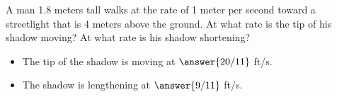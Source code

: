 \documentclass{ximera}
\author{Bart Snapp}
\begin{document}
\begin{exercise}

A man 1.8 meters tall walks at the rate of 1 meter per
second toward a streetlight that is 4 meters above the ground.  At
what rate is the tip of his shadow moving?  At what rate is his shadow
shortening?
\begin{prompt}
  \begin{itemize}
  \item The tip of the shadow is moving at $\answer{20/11}$ ft/s.
  \item The shadow is lengthening at $\answer{9/11}$ ft/s.
  \end{itemize}
\end{prompt}
\end{exercise}
\end{document}
